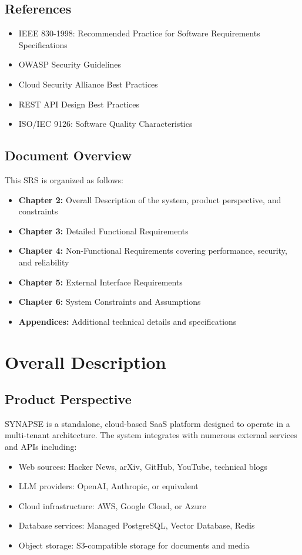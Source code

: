 \documentclass{report}
\begin{document}
\section{References}
\begin{itemize}
    \item IEEE 830-1998: Recommended Practice for Software Requirements Specifications
    \item OWASP Security Guidelines
    \item Cloud Security Alliance Best Practices
    \item REST API Design Best Practices
    \item ISO/IEC 9126: Software Quality Characteristics
\end{itemize}

\section{Document Overview}
This SRS is organized as follows:
\begin{itemize}
    \item \textbf{Chapter 2:} Overall Description of the system, product perspective, and constraints
    \item \textbf{Chapter 3:} Detailed Functional Requirements
    \item \textbf{Chapter 4:} Non-Functional Requirements covering performance, security, and reliability
    \item \textbf{Chapter 5:} External Interface Requirements
    \item \textbf{Chapter 6:} System Constraints and Assumptions
    \item \textbf{Appendices:} Additional technical details and specifications
\end{itemize}

\newpage
\chapter{Overall Description}

\section{Product Perspective}
SYNAPSE is a standalone, cloud-based SaaS platform designed to operate in a multi-tenant architecture. The system integrates with numerous external services and APIs including:
\begin{itemize}
    \item Web sources: Hacker News, arXiv, GitHub, YouTube, technical blogs
    \item LLM providers: OpenAI, Anthropic, or equivalent
    \item Cloud infrastructure: AWS, Google Cloud, or Azure
    \item Database services: Managed PostgreSQL, Vector Database, Redis
    \item Object storage: S3-compatible storage for documents and media
\end{itemize}
\end{document}
